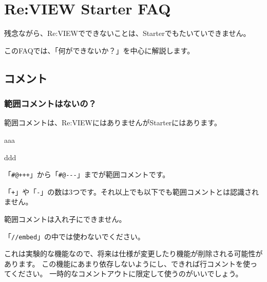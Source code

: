 \chapter{Re:VIEW Starter FAQ}
\label{chap:chap02-faq}
\begin{starterabstract}
残念ながら、Re:VIEWでできないことは、Starterでもたいていできません。

このFAQでは、「何ができないか？」を中心に解説します。
\end{starterabstract}

\section{コメント}
\label{sec:2-1}

\subsection{範囲コメントはないの？}
\label{sec:2-1-1}

範囲コメントは、Re:VIEWにはありませんがStarterにはあります。

\begin{starterprogram}\end{starterprogram}
\noindent
{}

\starterresult

aaa

ddd

\endstarterresult

\begin{starteritemize}
\item 「\texttt{\#@+++}」から「\texttt{\#@{-}{-}{-}}」までが範囲コメントです。
\item 「\texttt{+}」や「\texttt{{-}}」の数は3つです。それ以上でも以下でも範囲コメントとは認識されません。
\item 範囲コメントは入れ子にできません。
\item 「\texttt{//embed}」の中では使わないでください。
\item これは実験的な機能なので、将来は仕様が変更したり機能が削除される可能性があります。
   この機能にあまり依存しないようにし、できれば行コメントを使ってください。
   一時的なコメントアウトに限定して使うのがいいでしょう。
\end{starteritemize}

